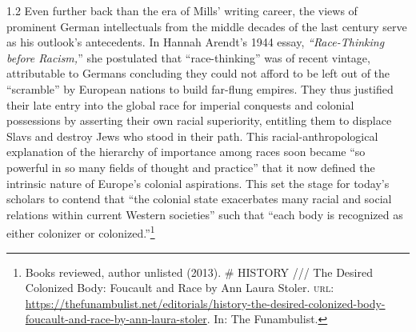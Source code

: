 \documentclass[../unravbook.tex]{subfiles}
\begin{document}
\begin{spacing}{1.2}
\vspace{.1em}
Even further back than the era of Mills' writing career, the views of prominent German intellectuals from the middle decades of the last century serve as his outlook's antecedents. In Hannah Arendt's 1944 essay, \textit{``Race-Thinking before Racism,}'' she postulated that ``race-thinking'' was of recent vintage, attributable to Germans concluding they could not afford to be left out of the ``scramble'' by European nations to build far-flung empires. They thus justified their late entry into the global race for imperial conquests and colonial possessions by asserting their own racial superiority, entitling them to displace Slavs and destroy Jews who stood in their path. This racial-anthropological explanation of the hierarchy of importance among races soon became ``so powerful in so many fields of thought and practice'' that it now defined the intrinsic nature of Europe's colonial aspirations. This set the stage for today's scholars to contend that ``the colonial state exacerbates many racial and social relations within current Western societies'' such that ``each body is recognized as either colonizer or colonized.''\footnote{Books reviewed, author unlisted (2013). \# HISTORY /// The Desired Colonized Body: Foucault and Race by Ann Laura Stoler. \textsc{url: } \url{https://thefunambulist.net/editorials/history-the-desired-colonized-body-foucault-and-race-by-ann-laura-stoler}. In: The Funambulist.} 


\end{spacing}
\end{document}
